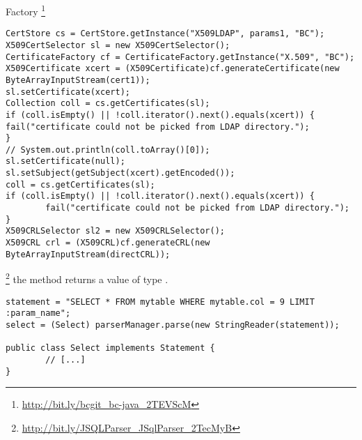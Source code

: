 \begin{pattern}{Factory}
\footnote{\url{http://bit.ly/bcgit_bc-java_2TEVScM}}

\begin{verbatim}
CertStore cs = CertStore.getInstance("X509LDAP", params1, "BC");
X509CertSelector sl = new X509CertSelector();
CertificateFactory cf = CertificateFactory.getInstance("X.509", "BC");
X509Certificate xcert = (X509Certificate)cf.generateCertificate(new ByteArrayInputStream(cert1));
sl.setCertificate(xcert);
Collection coll = cs.getCertificates(sl);
if (coll.isEmpty() || !coll.iterator().next().equals(xcert)) {
fail("certificate could not be picked from LDAP directory.");
}
// System.out.println(coll.toArray()[0]);
sl.setCertificate(null);
sl.setSubject(getSubject(xcert).getEncoded());
coll = cs.getCertificates(sl);
if (coll.isEmpty() || !coll.iterator().next().equals(xcert)) {
        fail("certificate could not be picked from LDAP directory.");
}
X509CRLSelector sl2 = new X509CRLSelector();
X509CRL crl = (X509CRL)cf.generateCRL(new ByteArrayInputStream(directCRL));
\end{verbatim}


\footnote{\url{http://bit.ly/JSQLParser_JSqlParser_2TecMyB}}
the  method returns a value of type .

\begin{verbatim}
statement = "SELECT * FROM mytable WHERE mytable.col = 9 LIMIT :param_name";
select = (Select) parserManager.parse(new StringReader(statement));

public class Select implements Statement {
        // [...]
}
\end{verbatim}


\detection{}

\discussion{}

\related{}

\end{pattern}